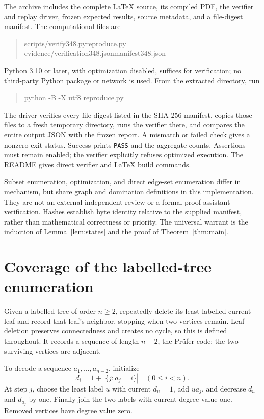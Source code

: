 \documentclass[11pt,a4paper]{article}
\theoremstyle{remark}
\begin{document}
The archive includes the complete LaTeX source, its compiled PDF,
the verifier and replay driver, frozen expected results, source
metadata, and a file-digest manifest. The computational files are
\begin{quote}\small\ttfamily
scripts/verify348.py\quad reproduce.py\\
evidence/verification348.json\quad manifest348.json
\end{quote}
Python 3.10 or later, with optimization
disabled, suffices for verification; no third-party Python package
or network is used. From the extracted directory, run
\begin{quote}\ttfamily
python -B -X utf8 reproduce.py
\end{quote}
The driver verifies every file digest listed in the SHA-256 manifest,
copies those files to a fresh temporary directory, runs the verifier
there, and compares the entire output JSON with the frozen report.
A mismatch or failed check gives a nonzero exit status. Success
prints \texttt{PASS} and the aggregate counts. Assertions must remain
enabled; the verifier explicitly refuses optimized execution.
The README gives direct verifier and LaTeX build commands.

Subset enumeration, optimization, and direct edge-set enumeration
differ in mechanism, but share graph and domination definitions in
this implementation. They are not an external independent review
or a formal proof-assistant verification. Hashes establish byte
identity relative to the supplied manifest, rather than mathematical
correctness or priority. The universal warrant is the induction of
Lemma~\ref{lem:states} and the proof of Theorem~\ref{thm:main}.

\appendix
\section{Coverage of the labelled-tree enumeration}
\label{app:pruefer}

Given a labelled tree of order $n\ge 2$, repeatedly delete its
least-labelled current leaf and record that leaf's neighbor,
stopping when two vertices remain. Leaf deletion preserves
connectedness and creates no cycle, so this is defined throughout.
It records a sequence of length $n-2$, the Pr\"ufer code; the
two surviving vertices are adjacent.

To decode a sequence $a_1,\ldots,a_{n-2}$, initialize
\[
 d_i=1+|\{j:a_j=i\}|\quad(0\le i<n).
\]
At step $j$, choose the least label $u$ with current $d_u=1$, add
$ua_j$, and decrease $d_u$ and $d_{a_j}$ by one.
Finally join the two labels with current degree value one.
Removed vertices have degree value zero.
\end{document}
